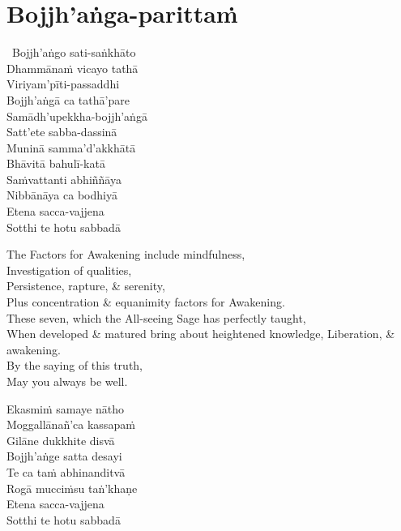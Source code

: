 \suttaRef{[MJG]}



\section{Bojjh'aṅga-parittaṁ}
\label{bojjhana-parittam}


\begin{pali-hangtogether}
  \anglebracketleft\ \hspace{-0.5mm}Bojjh'aṅgo sati-saṅkhāto \hspace{-0.5mm}\anglebracketright\ \\
  Dhammānaṁ vicayo tathā\\
  Viriyam'pīti-passaddhi\\
  Bojjh'aṅgā ca tathā'pare\\
  Samādh'upekkha-bojjh'aṅgā\\
  Satt'ete sabba-dassinā\\
  Muninā samma'd'akkhātā\\
  Bhāvitā bahulī-katā\\
  Saṁvattanti abhiññāya\\
  Nibbānāya ca bodhiyā\\
  Etena sacca-vajjena\\
  Sotthi te hotu sabbadā
\end{pali-hangtogether}

\begin{english-verses}
  The Factors for Awakening include mindfulness,\\
  Investigation of qualities,\\
  Persistence, rapture, \& serenity,\\
  Plus concentration \& equanimity factors for Awakening.\\
  These seven, which the All-seeing Sage has perfectly taught,\\
  When developed \& matured bring about heightened knowledge, Liberation, \& awakening.\\
  By the saying of this truth,\\
  May you always be well.
\end{english-verses}

\begin{pali-hang-continued}
  Ekasmiṁ samaye nātho\\
  Moggallānañ'ca kassapaṁ\\
  Gilāne dukkhite disvā\\
  Bojjh'aṅge satta desayi\\
  Te ca taṁ abhinanditvā\\
  Rogā mucciṁsu taṅ'khaṇe\\
  Etena sacca-vajjena\\
  Sotthi te hotu sabbadā
\end{pali-hang-continued}

